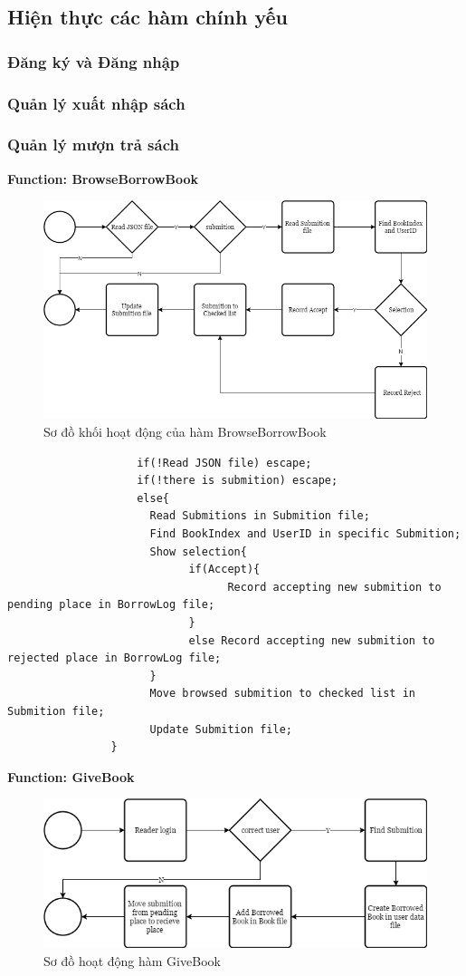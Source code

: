 \documentclass[12pt,a4paper]{report}
\begin{document}
		\subsection{Hiện thực các hàm chính yếu}
			\subsubsection{Đăng ký và Đăng nhập}
			\subsubsection{Quản lý xuất nhập sách}
			\subsubsection{Quản lý mượn trả sách}
				\textbf{Function: BrowseBorrowBook}
				\begin{figure}[H]
					\centering
					\label{F:browsebook}
					\includegraphics[scale = .4]{browsebook.png}
					\caption{Sơ đồ khối hoạt động của hàm BrowseBorrowBook}
				\end{figure}
				\begin{verbatim}
					if(!Read JSON file) escape;
					if(!there is submition) escape;
					else{
					  Read Submitions in Submition file;
					  Find BookIndex and UserID in specific Submition;
					  Show selection{
						    if(Accept){
							      Record accepting new submition to pending place in BorrowLog file;
						    }
						    else Record accepting new submition to rejected place in BorrowLog file;
					  }
					  Move browsed submition to checked list in Submition file;
					  Update Submition file;
				}
				\end{verbatim}
				\textbf{Function: GiveBook}
				\begin{figure}[H]
					\centering
					\label{G:givebook}
					\includegraphics[scale = .4]{givebook.png}
					\caption{Sơ đồ hoạt động hàm GiveBook}
				\end{figure}
\end{document}
